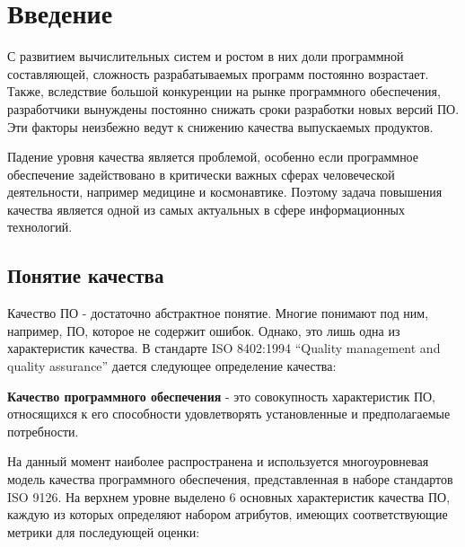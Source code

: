 \section{Введение} %

С развитием вычислительных систем и ростом в них доли
программной составляющей, сложность разрабатываемых программ постоянно
возрастает. Также, вследствие большой конкуренции на рынке программного
обеспечения, разработчики вынуждены постоянно снижать сроки разработки новых
версий ПО. Эти факторы неизбежно ведут к снижению качества выпускаемых
продуктов.

Падение уровня качества является проблемой, особенно если программное
обеспечение задействовано в критически важных сферах человеческой деятельности,
например медицине и космонавтике. Поэтому задача повышения качества является
одной из самых актуальных в сфере информационных технологий.

\subsection{Понятие качества} %

Качество ПО - достаточно абстрактное понятие. Многие понимают под ним, например,
ПО, которое не содержит ошибок. Однако, это лишь одна из характеристик качества.
В стандарте ISO 8402:1994 ``Quality management and quality assurance'' дается
следующее определение качества:

\textbf{Качество программного обеспечения} - это совокупность характеристик ПО,
относящихся к его способности удовлетворять установленные и предполагаемые
потребности.

На данный момент наиболее распространена и используется многоуровневая модель
качества программного обеспечения, представленная в наборе стандартов ISO 9126.
На верхнем уровне выделено 6 основных характеристик качества ПО, каждую из
которых определяют набором атрибутов, имеющих соответствующие метрики для
последующей оценки:

